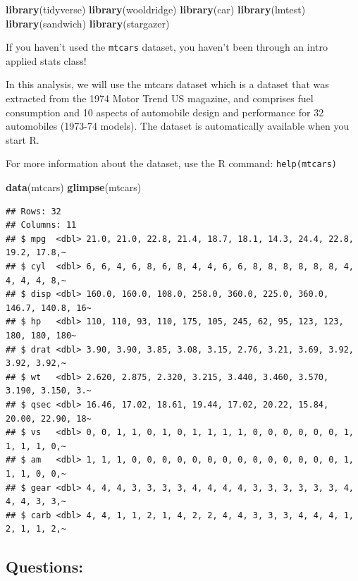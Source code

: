 \documentclass[
]{book}
\newenvironment{Shaded}{\begin{snugshade}}{\end{snugshade}}
\newcommand{\FunctionTok}[1]{\textcolor[rgb]{0.13,0.29,0.53}{\textbf{#1}}}
\newcommand{\NormalTok}[1]{#1}
\theoremstyle{definition}
\theoremstyle{definition}
\theoremstyle{definition}
\theoremstyle{definition}
\theoremstyle{remark}
\begin{document}
\begin{Shaded}
\begin{Highlighting}[]
\FunctionTok{library}\NormalTok{(tidyverse)}
\FunctionTok{library}\NormalTok{(wooldridge)}
\FunctionTok{library}\NormalTok{(car)}
\FunctionTok{library}\NormalTok{(lmtest)}
\FunctionTok{library}\NormalTok{(sandwich)}
\FunctionTok{library}\NormalTok{(stargazer)}
\end{Highlighting}
\end{Shaded}

If you haven't used the \texttt{mtcars} dataset, you haven't been through an intro applied stats class!

In this analysis, we will use the mtcars dataset which is a dataset that was extracted from the 1974 Motor Trend US magazine, and comprises fuel consumption and 10 aspects of automobile design and performance for 32 automobiles (1973-74 models). The dataset is automatically available when you start R.

For more information about the dataset, use the R command: \texttt{help(mtcars)}

\begin{Shaded}
\begin{Highlighting}[]
\FunctionTok{data}\NormalTok{(mtcars)}
\FunctionTok{glimpse}\NormalTok{(mtcars)}
\end{Highlighting}
\end{Shaded}

\begin{verbatim}
## Rows: 32
## Columns: 11
## $ mpg  <dbl> 21.0, 21.0, 22.8, 21.4, 18.7, 18.1, 14.3, 24.4, 22.8, 19.2, 17.8,~
## $ cyl  <dbl> 6, 6, 4, 6, 8, 6, 8, 4, 4, 6, 6, 8, 8, 8, 8, 8, 8, 4, 4, 4, 4, 8,~
## $ disp <dbl> 160.0, 160.0, 108.0, 258.0, 360.0, 225.0, 360.0, 146.7, 140.8, 16~
## $ hp   <dbl> 110, 110, 93, 110, 175, 105, 245, 62, 95, 123, 123, 180, 180, 180~
## $ drat <dbl> 3.90, 3.90, 3.85, 3.08, 3.15, 2.76, 3.21, 3.69, 3.92, 3.92, 3.92,~
## $ wt   <dbl> 2.620, 2.875, 2.320, 3.215, 3.440, 3.460, 3.570, 3.190, 3.150, 3.~
## $ qsec <dbl> 16.46, 17.02, 18.61, 19.44, 17.02, 20.22, 15.84, 20.00, 22.90, 18~
## $ vs   <dbl> 0, 0, 1, 1, 0, 1, 0, 1, 1, 1, 1, 0, 0, 0, 0, 0, 0, 1, 1, 1, 1, 0,~
## $ am   <dbl> 1, 1, 1, 0, 0, 0, 0, 0, 0, 0, 0, 0, 0, 0, 0, 0, 0, 1, 1, 1, 0, 0,~
## $ gear <dbl> 4, 4, 4, 3, 3, 3, 3, 4, 4, 4, 4, 3, 3, 3, 3, 3, 3, 4, 4, 4, 3, 3,~
## $ carb <dbl> 4, 4, 1, 1, 2, 1, 4, 2, 2, 4, 4, 3, 3, 3, 4, 4, 4, 1, 2, 1, 1, 2,~
\end{verbatim}

\hypertarget{questions-1}{%
\subsection{Questions:}\label{questions-1}}
\end{document}
